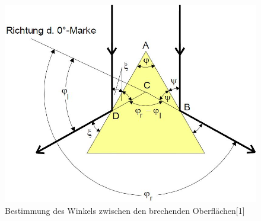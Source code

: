 	\begin{figure}[h]
		\begin{center}
		\includegraphics[scale=0.3]{picprismawinkel.jpg}
		\caption{Bestimmung des Winkels zwischen den brechenden Oberflächen[1]}
		\label{picprismawinkel}
		\end{center}	
	\end{figure}